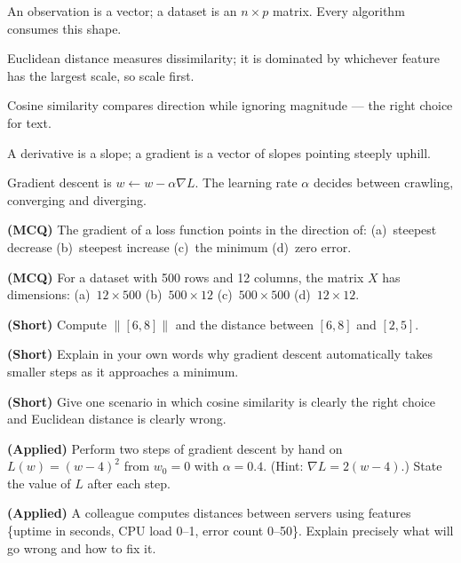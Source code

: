\begin{chaptersummary}
\begin{tight}
  \item An observation is a vector; a dataset is an $n \times p$ matrix. Every
        algorithm consumes this shape.
  \item Euclidean distance measures dissimilarity; it is dominated by whichever
        feature has the largest scale, so scale first.
  \item Cosine similarity compares direction while ignoring magnitude --- the
        right choice for text.
  \item A derivative is a slope; a gradient is a vector of slopes pointing
        steeply uphill.
  \item Gradient descent is $w \leftarrow w - \alpha \nabla L$. The learning rate
        $\alpha$ decides between crawling, converging and diverging.
\end{tight}
\end{chaptersummary}

\begin{reviewq}
  \item \textbf{(MCQ)} The gradient of a loss function points in the direction of:
        (a)~steepest decrease (b)~steepest increase (c)~the minimum (d)~zero error.
  \item \textbf{(MCQ)} For a dataset with 500 rows and 12 columns, the matrix $X$
        has dimensions: (a)~$12 \times 500$ (b)~$500 \times 12$ (c)~$500 \times
        500$ (d)~$12 \times 12$.
  \item \textbf{(Short)} Compute $\|[6, 8]\|$ and the distance between $[6,8]$ and
        $[2,5]$.
  \item \textbf{(Short)} Explain in your own words why gradient descent
        automatically takes smaller steps as it approaches a minimum.
  \item \textbf{(Short)} Give one scenario in which cosine similarity is clearly
        the right choice and Euclidean distance is clearly wrong.
  \item \textbf{(Applied)} Perform two steps of gradient descent by hand on
        $L(w) = (w-4)^2$ from $w_0 = 0$ with $\alpha = 0.4$. (Hint: $\nabla L =
        2(w-4)$.) State the value of $L$ after each step.
  \item \textbf{(Applied)} A colleague computes distances between servers using
        features \{uptime in seconds, CPU load 0--1, error count 0--50\}. Explain
        precisely what will go wrong and how to fix it.
\end{reviewq}
